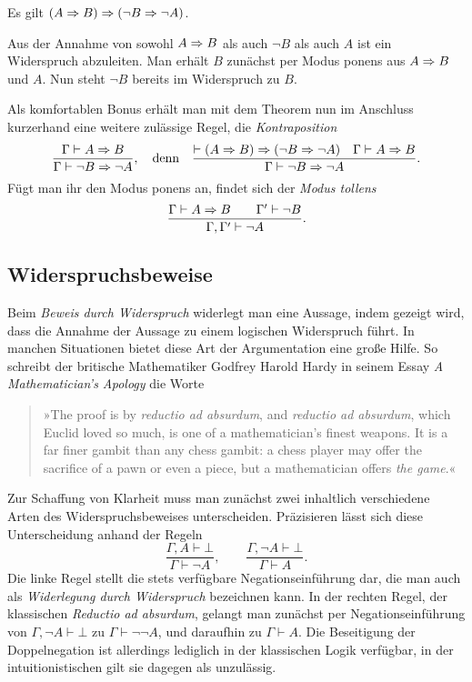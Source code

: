 \begin{Satz}
Es gilt $(A\Rightarrow B)\Rightarrow (\lnot B\Rightarrow\lnot A)$.
\end{Satz}
 Aus der Annahme von sowohl $A\Rightarrow B$ als
auch $\lnot B$ als auch $A$ ist ein Widerspruch abzuleiten.
Man erhält $B$ zunächst per Modus ponens aus $A\Rightarrow B$ und $A$.
Nun steht $\lnot B$ bereits im Widerspruch zu $B$.\,\qedsymbol

Als komfortablen Bonus erhält man mit dem Theorem nun im Anschluss
kurzerhand eine weitere zulässige Regel, die
\emph{Kontraposition}
\[\dfrac{\Gamma\vdash A\Rightarrow B}{\Gamma\vdash\lnot B\Rightarrow\lnot A},
\quad\text{denn}\quad
\dfrac{\vdash (A\Rightarrow B)\Rightarrow (\lnot B\Rightarrow\lnot A)\quad\Gamma\vdash A\Rightarrow B}
{\Gamma\vdash \lnot B\Rightarrow\lnot A}.\]
Fügt man ihr den Modus ponens an, findet sich der
\emph{Modus tollens}
\[\dfrac{\Gamma\vdash A\Rightarrow B\qquad\Gamma'\vdash\lnot B}
{\Gamma,\Gamma'\vdash\lnot A}.\]

\subsection{Widerspruchsbeweise}

Beim \emph{Beweis durch Widerspruch} widerlegt man eine Aussage, indem
gezeigt wird, dass die Annahme der Aussage zu einem logischen
Widerspruch führt. In manchen Situationen bietet diese Art der
Argumentation eine große Hilfe. So schreibt der britische Mathematiker
Godfrey Harold Hardy in seinem Essay \emph{A Mathematician's Apology}
die Worte
\begin{quote}
»The proof is by \emph{reductio ad absurdum}, and \emph{reductio ad
absurdum}, which Euclid loved so much, is one of a mathematician's
finest weapons. It is a far finer gambit than any chess gambit: a chess
player may offer the sacrifice of a pawn or even a piece, but a
mathematician offers \emph{the game}.«
\end{quote}
Zur Schaffung von Klarheit muss man zunächst zwei inhaltlich
verschiedene Arten des Widerspruchsbeweises unterscheiden.
Präzisieren lässt sich diese Unterscheidung anhand
der Regeln
\[\dfrac{\Gamma,A\vdash\bot}{\Gamma\vdash\lnot A},\qquad
\dfrac{\Gamma,\lnot A\vdash\bot}{\Gamma\vdash A}.\]
Die linke Regel stellt die stets verfügbare Negationseinführung dar,
die man auch als \emph{Widerlegung durch Widerspruch} bezeichnen kann.
In der rechten Regel, der klassischen \emph{Reductio ad absurdum},
gelangt man zunächst per Negationseinführung von
$\Gamma,\lnot A\vdash\bot$ zu $\Gamma\vdash\lnot\lnot A$, und daraufhin
zu $\Gamma\vdash A$. Die Beseitigung der Doppelnegation ist allerdings
lediglich in der klassischen Logik verfügbar, in der intuitionistischen
gilt sie dagegen als unzulässig.

